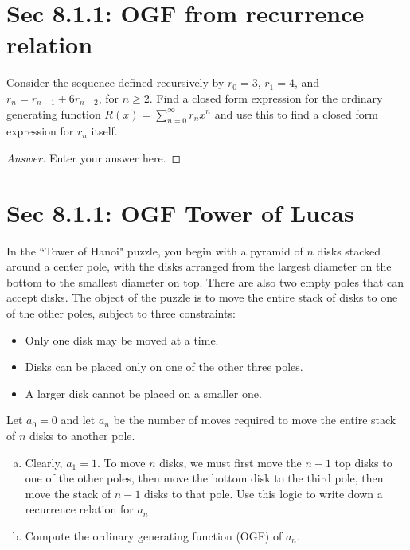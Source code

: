 \documentclass[12pt, oneside]{amsart}
\begin{document}
\tableofcontents


\section{Sec 8.1.1: OGF from recurrence relation}
Consider the sequence defined recursively by $r_0 = 3$, $r_1 = 4$, and $r_n = r_{n-1} + 6 r_{n-2}$, for $n  \geq 2$. 
Find a closed form expression for the ordinary generating function $\displaystyle R(x)=\sum_{n=0}^\infty r_n x^n$ and use this to find a closed form expression for $r_n$ itself.

\begin{proof}[Answer]
Enter your answer here.
\end{proof}




\section{Sec 8.1.1: OGF Tower of Lucas}
In the ``Tower of Hanoi" puzzle, you begin with a pyramid of $n$ disks stacked around a center pole, with the disks arranged from the largest diameter on the bottom to the smallest diameter on top. 
There are also two empty poles that can accept disks. 
The object of the puzzle is to move the entire stack of disks to one of the other poles, subject to three constraints:
\begin{itemize}
	\item Only one disk may be moved at a time. 
	\item Disks can be placed only on one of the other three poles. 
	\item A larger disk cannot be placed on a smaller one. 
\end{itemize}
Let  $a_0=0$ and let $a_n$ be the number of moves required to move the entire stack of $n$ disks to another pole. 

\begin{enumerate}[a.]
	\item Clearly, $a_1=1$.
	To move $n$ disks, we must first move the $n-1$ top disks to one of the other poles, then move the bottom disk to the third pole, then move the stack of $n-1$ disks to that pole. Use this logic to write down a recurrence relation for $a_n$
	
	\item 
	Compute the ordinary generating function (OGF) of $a_n$.
\end{enumerate}
\end{document}
